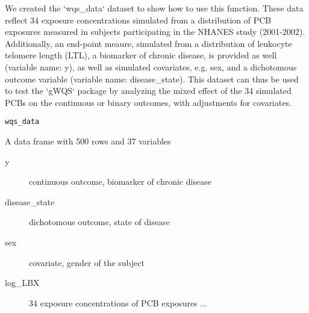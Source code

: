 \documentclass[a4paper]{book}
\begin{document}
%
\begin{Description}\relax
We created the `wqs\_data` dataset to show how to use this function. These data reflect
34 exposure concentrations simulated from a distribution of PCB exposures measured in
subjects participating in the NHANES study (2001-2002). Additionally, an end-point
meaure, simulated from a distribution of leukocyte telomere length (LTL), a biomarker
of chronic disease, is provided as well (variable name: y), as well as simulated
covariates, e.g. sex, and a dichotomous outcome variable (variable name: disease\_state).
This dataset can thus be used to test the `gWQS` package by analyzing the mixed effect
of the 34 simulated PCBs on the continuous or binary outcomes, with adjustments for
covariates.
\end{Description}
%
\begin{Usage}
\begin{verbatim}
wqs_data
\end{verbatim}
\end{Usage}
%
\begin{Format}
A data frame with 500 rows and 37 variables
\end{Format}
%
\begin{Details}\relax
\begin{description}

\item[y] continuous outcome, biomarker of chronic disease
\item[disease\_state] dichotomous outcome, state of disease
\item[sex] covariate, gender of the subject
\item[log\_LBX] 34 exposure concentrations of PCB exposures
...

\end{description}

\end{Details}
\printindex{}
\end{document}
